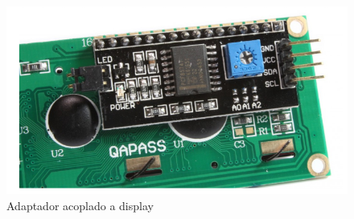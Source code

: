 \begin{figure}
	\vspace{-8mm}
	\centering
	\includegraphics[width=\linewidth]{img/i2clcd.png}
	\caption[Adaptador \IIC acoplado a LCD]{Adaptador \IIC acoplado a display\footnotemark}%
	\label{fig:lcd} %
\end{figure}

